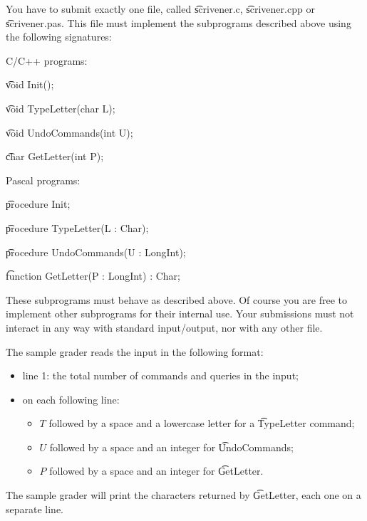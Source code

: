 You have to submit exactly one file, called \t{scrivener.c}, \t{scrivener.cpp} or \t{scrivener.pas}. This file must implement the subprograms described above using the following signatures:

C/C++ programs:

\t{void Init();}

\t{void TypeLetter(char L);}

\t{void UndoCommands(int U);}

\t{char GetLetter(int P);}

Pascal programs:

\t{procedure Init;}

\t{procedure TypeLetter(L : Char);}

\t{procedure UndoCommands(U : LongInt);}

\t{function GetLetter(P : LongInt) : Char;}

These subprograms must behave as described above. Of course you are free to implement other subprograms for their internal use. Your submissions must not interact in any way with standard input/output, nor with any other file.

The sample grader reads the input in the following format:

\begin{itemize}
\item line 1: the total number of commands and queries in the input;
\item on each following line:
\begin{itemize}
\item $T$ followed by a space and a lowercase letter for a \t{TypeLetter} command;
\item $U$ followed by a space and an integer for \t{UndoCommands};
\item $P$ followed by a space and an integer for \t{GetLetter}.
\end{itemize}
\end{itemize}

The sample grader will print the characters returned by \t{GetLetter}, each one on a separate line.

